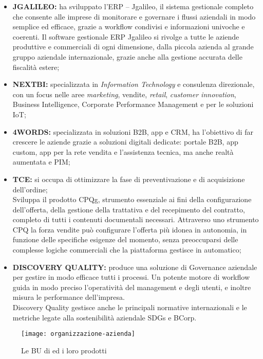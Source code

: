 \begin{itemize}
  \item \textbf{JGALILEO:} ha sviluppato l’\gls{ERP} –  Jgalileo, il sistema gestionale completo che consente alle imprese di monitorare e governare i flussi aziendali in modo semplice ed efficace, grazie a workflow condivisi e informazioni univoche e coerenti. Il software gestionale ERP Jgalileo si rivolge a tutte le aziende produttive e commerciali di ogni dimensione, dalla piccola azienda al grande gruppo aziendale internazionale, grazie anche alla gestione accurata delle fiscalità estere;
  \item \textbf{NEXTBI:} specializzata in \textit{Information Technology} e consulenza direzionale, con un focus nelle aree \textit{marketing}, vendite, \textit{retail}, \textit{customer innovation}, Business Intelligence, Corporate Performance Management e per le soluzioni \gls{IoT};
  \item \textbf{4WORDS:} specializzata in soluzioni \gls{B2B}, app e \gls{CRM}, ha l’obiettivo di far crescere le aziende grazie a soluzioni digitali dedicate: portale B2B, \gls{app} custom, app per la rete vendita e l’assistenza tecnica, ma anche realtà aumentata e \gls{PIM};
  \item \textbf{TCE:} si occupa di ottimizzare la fase di preventivazione e di acquisizione dell’ordine; \\
  Sviluppa il prodotto \gls{CPQg}, strumento essenziale ai fini della configurazione dell’offerta, 
  della gestione della trattativa e del recepimento del contratto, completo di tutti i contenuti documentali necessari.
  Attraverso uno strumento CPQ la forza vendite può configurare l’offerta più idonea in autonomia, in funzione delle specifiche esigenze del momento, senza preoccuparsi delle complesse logiche commerciali che la piattaforma gestisce in automatico;
  \item \textbf{DISCOVERY QUALITY:} produce una soluzione di Governance aziendale per gestire in modo efficace tutti i processi. 
  Un potente motore di workflow guida in modo preciso l’operatività del management e degli utenti, e inoltre misura le performance dell’impresa. \\
  Discovery Quality gestisce anche le principali normative internazionali e le metriche legate alla sostenibilità aziendale \gls{SDGs} e \gls{BCorp}.


\end{itemize}


\begin{figure}[!h] 
  \centering 
  \texttt{[image: organizzazione-azienda]} 
  \caption{Le BU di {\azienda} ed i loro prodotti}
  \label{fig:organizzazione-azienda}
\end{figure}

